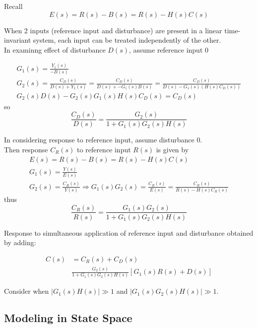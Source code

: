 \documentclass[10pt]{amsart}
\begin{document}
\begin{multicols*}{2}
Recall
\[
E(s) = R(s) - B(s) = R(s) - H(s)C(s)
\]

When 2 inputs (reference input and disturbance) are present in a linear time-invariant system, each input can be treated independently of the other. \\

In examinng effect of disturbance $D(s)$, assume reference input $0$

\[
\begin{gathered}
G_1(s) = \frac{Y_1(s) }{ -B(s) } \\
G_2(s) = \frac{ C_D(s)}{ D(s) + Y_1(s)} = \frac{C_D(s) }{ D(s) +  - G_1(s)B(s) } = \frac{C_D(s)}{ D(s) - G_1(s)(H(s) C_D(s) ) } \\
G_2(s) D(s) - G_2(s) G_1(s) H(s) C_D(s) = C_D(s) 
\end{gathered}
\]
so
\begin{equation}
\frac{C_D(s)}{ D(s) } = \frac{G_2(s) }{ 1 + G_1(s) G_2(s) H(s) } 
\end{equation}

In considering response to reference input, assume disturbance $0$. \\
Then response $C_R(s)$ to reference input $R(s)$ is given by
\[
\begin{gathered}
	E(s) = R(s) - B(s) = R(s) - H(s) C(s) \\
G_1(s) = \frac{Y(s)}{E(s)} \\
G_2(s) = \frac{C_R(s)}{Y(s) } \Longrightarrow G_1(s) G_2(s) = \frac{C_R(s) }{ E(s) } = \frac{C_R(s)}{R(s) - H(s) C_R(s) }
\end{gathered}
\]
thus
\begin{equation}
\frac{C_R(s)}{R(s)} = \frac{G_1(s) G_2(s)}{ 1 + G_1(s) G_2(s) H(s) }
\end{equation}

Response to simultaneous application of reference input and disturbance obtained by adding:

\begin{equation}
\begin{aligned}
C(s) & = C_R(s) + C_D(s) \\
& \frac{G_2(s) }{ 1 + G_1(s) G_2(s) H(s) } \left[ G_1(s) R(s) + D(s) \right]
\end{aligned}
\end{equation}

Consider when $|G_1(s)H(s) | \gg 1$ and $|G_1(s) G_2(s) H(s) | \gg 1$.

\subsection{Modeling in State Space}


\end{multicols*}
\end{document}
